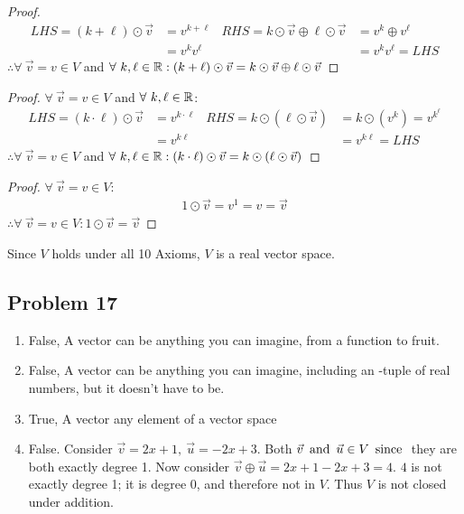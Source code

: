 \begin{enumerate}
\begin{proof}
\begin{align*}
      LHS = (k + \ell) \odot \vec{v} & = v^{k+\ell} & RHS = k \odot \vec{v} \oplus \ell \odot \vec{v} & = v^k \oplus v^\ell \\
                                     & = v^kv^\ell  &                                                 & = v^kv^\ell = LHS
    \end{align*}
    $\therefore \forall~\vec{v} = v \in V$ and $\forall~k,\ell \in \mathbb{R}: (k + \ell) \odot \vec{v} = k \odot \vec{v} \oplus \ell \odot \vec{v}$
  \end{proof}
  \begin{proof}
    $\forall~\vec{v} = v \in V$ and $\forall~k,\ell \in \mathbb{R}$:
    \begin{align*}
      LHS = (k \cdot \ell) \odot \vec{v} & = v^{k \cdot \ell} & RHS = k \odot (\ell \odot \vec{v}) & = k \odot (v^k) = v^{k^\ell} \\
                                         & = v^{k\ell}        &                                    & = v^{k\ell} = LHS
    \end{align*}
    $\therefore \forall~\vec{v} = v \in V$ and $\forall~k,\ell \in \mathbb{R}: (k \cdot \ell) \odot \vec{v} = k \odot (\ell \odot \vec{v})$
  \end{proof}
  \begin{proof}
    $\forall~\vec{v} = v \in V$:
    \begin{align*}
      1 \odot \vec{v} = v^1 = v = \vec{v}
    \end{align*}
    $\therefore \forall~\vec{v} = v \in V: 1 \odot \vec{v} = \vec{v}$
  \end{proof}
  Since $V$ holds under all 10 Axioms, $V$ is a real vector space.
\end{enumerate}

\subsection*{Problem 17}
\begin{enumerate}
   
  \item[] False, A vector can be anything you can imagine, from a function to fruit.
     
  \item[] False, A vector can be anything you can imagine, including an -tuple of real numbers, but it doesn't have to be.
     
  \item[] True, A vector  any element of a vector space
     
  \item[] False. Consider $\vec{v} = 2x + 1,~\vec{u} = -2x +3$. Both $\vec{v} \operatorname{~\text{and}~} \vec{u} \in V \operatorname{~\text{since}~}$ they are both exactly degree 1. Now consider $\vec{v} \oplus \vec{u} = 2x +1 -2x +3 = 4$. $4$ is not exactly degree 1; it is degree 0, and therefore not in $V$. Thus $V$ is not closed under addition.
\end{enumerate}
